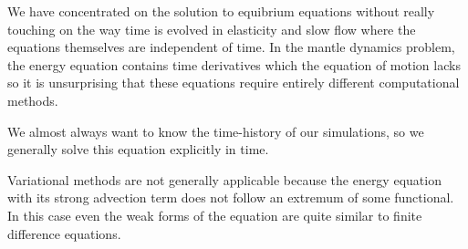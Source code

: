 \documentclass[10pt]{article}
\begin{document}
	We have concentrated on the solution to equibrium equations without really
	touching on the way time is evolved in elasticity and slow flow where the 
	equations themselves are independent of time.
	In the mantle dynamics problem, the energy equation contains time derivatives which the equation of
	motion lacks so it is unsurprising that these equations require entirely
	different computational methods.
	
	We almost always want to know the time-history 
	of our simulations, so we generally solve this equation explicitly
	in time. 
	
	Variational methods are not generally applicable because the energy equation with
	its strong advection term does not follow an extremum of some functional. In this
	case even the weak forms of the equation are quite similar to finite difference equations.
	
%	
%	
%	
%
%	
%
\end{document}

